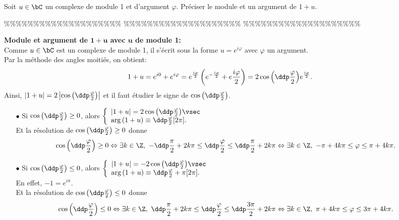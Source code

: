 



\begin{exercice}  \;
 Soit $u\in\bC$ un complexe de module 1 et d'argument $\varphi$. Pr\'eciser le module et un argument de $1+u$.
\end{exercice}


\%\%\%\%\%\%\%\%\%\%\%\%\%\%\%\%\%\%\%\%
\%\%\%\%\%\%\%\%\%\%\%\%\%\%\%\%\%\%\%\%
\%\%\%\%\%\%\%\%\%\%\%\%\%\%\%\%\%\%\%\%




\begin{correction}   \; \textbf{Module et argument de $\mathbf{1+u}$ avec $\mathbf{u}$ de module 1:}\\
Comme $u\in\bC$ est un complexe de module 1, il s'\'ecrit sous la forme $u=e^{i\varphi}$ avec $\varphi$ un argument.\\
Par la m\'ethode des angles moiti\'es, on obtient:
$$
1+u = e^{i0}+e^{i\varphi}= e^{\frac{i\varphi}{2}}\left( e^{-\frac{i\varphi}{2}}+e{\frac{i\varphi}{2}}  \right)= 2\cos{\left(\ddp\frac{\varphi}{2}  \right)}e^{\frac{i\varphi}{2}}.$$
Ainsi, $|1+u|=2\left|\cos{\left(\ddp\frac{\varphi}{2}\right)}\right|$ et il faut \'etudier le signe de $\cos{\left(\ddp\frac{\varphi}{2}\right)}$.
\begin{itemize}
 \item[$\bullet$] Si $\cos{\left(\ddp\frac{\varphi}{2}\right)}\geq 0$, alors $\left\lbrace\begin{array}{l}
|1+u|=2\cos{\left(\ddp\frac{\varphi}{2}\right)} \vsec\\
\arg{(1+u)}\equiv \ddp\frac{\varphi}{2}\lbrack 2\pi\rbrack.
\end{array}\right.$\\
Et la r\'esolution de $\cos{\left(\ddp\frac{\varphi}{2}\right)}\geq 0$ donne
$$
\cos{\left(\ddp\frac{\varphi}{2}\right)}\geq 0  \Leftrightarrow \exists k\in\Z,\ -\ddp\frac{\pi}{2}+2k\pi\leq \ddp\frac{\varphi}{2}\leq \ddp\frac{\pi}{2}+2k\pi\Leftrightarrow  \exists k\in\Z,\ -\pi+4k\pi\leq \varphi\leq \pi+4k\pi.$$
\item[$\bullet$] Si $\cos{\left(\ddp\frac{\varphi}{2}\right)}\leq 0$, alors $\left\lbrace\begin{array}{l}
|1+u|=-2\cos{\left(\ddp\frac{\varphi}{2}\right)} \vsec\\
\arg{(1+u)}\equiv \ddp\frac{\varphi}{2}+\pi\lbrack 2\pi\rbrack.
\end{array}\right.$\\
En effet, $-1=e^{i\pi}$.\\
Et la r\'esolution de $\cos{\left(\ddp\frac{\varphi}{2}\right)}\leq 0$ donne
$$
\cos{\left(\ddp\frac{\varphi}{2}\right)}\leq 0  \Leftrightarrow \exists k\in\Z,\ \ddp\frac{\pi}{2}+2k\pi\leq \ddp\frac{\varphi}{2}\leq \ddp\frac{3\pi}{2}+2k\pi
\Leftrightarrow  \exists k\in\Z,\ \pi+4k\pi\leq \varphi\leq 3\pi+4k\pi.$$  
\end{itemize}
\end{correction}